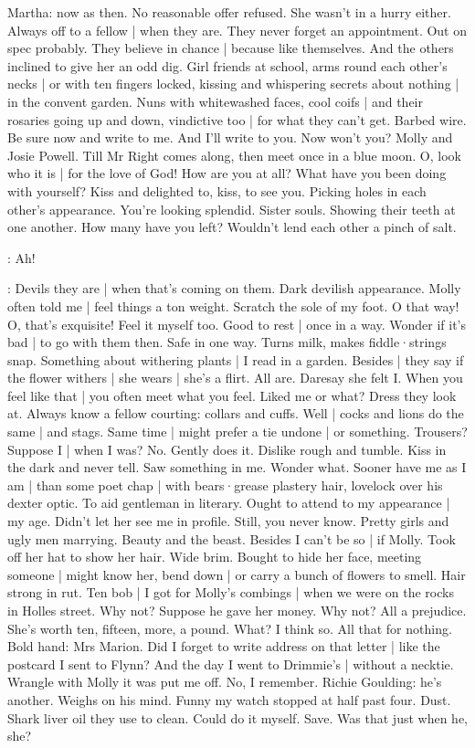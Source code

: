 Martha:
now as then.
No reasonable offer refused.
She wasn't in a hurry either.
Always off to a fellow |
when they are.
They never forget an appointment.
Out on spec probably.
They believe in chance |
because like themselves.
And the others inclined to give her an odd dig.
Girl friends at school,
arms round each other's necks |%
or with ten fingers locked,
kissing and whispering secrets about nothing |
in the convent garden.
Nuns with whitewashed faces,
cool coifs |
and their rosaries
going up and down,
vindictive too |
for what they can't get.
Barbed wire.
Be sure now and write to me.
And I'll write to you.
Now won't you?
Molly and Josie Powell.
Till Mr Right comes along,
then meet once in a blue moon.
O,
look who it is |
for the love of God!
How are you at all?
What have you been doing with yourself?
Kiss and delighted to,
kiss,
to see you.
Picking holes in each other's appearance.
You're looking splendid.
Sister souls.
Showing their teeth at one another.
How many have you left?
Wouldn't lend each other
a pinch of salt.

\Bloom:
Ah!

\Bloom:
Devils they are |
when that's coming on them.
Dark devilish appearance.
Molly often told me |
feel things a ton weight.
Scratch the sole of my foot.
O that way!
O,
that's exquisite!
Feel it myself too.
Good to rest |
once in a way.
Wonder if it's bad |
to go with them then.
Safe in one way.
Turns milk,
makes fiddle·strings snap.
Something about withering plants |
I read in a garden.
Besides |
they say if the flower withers |
she wears |
she's a flirt.
All are.
Daresay she felt I.
When you feel like that |
you often meet what you feel.
Liked me or what?
Dress they look at.
Always know a fellow courting:
collars and cuffs.%
Well |
cocks and lions do the same |
and stags.
Same time |
might prefer a tie undone |
or something.
Trousers?
Suppose I |
when I was?
No.
Gently does it.
Dislike rough and tumble.
Kiss in the dark
and never tell.
Saw something in me.
Wonder what.
Sooner have me
as I am |
than some poet chap |
with bears·grease plastery hair,
lovelock over his dexter optic.
To aid gentleman in literary.
Ought to attend to my appearance |
my age.
Didn't let her see me in profile.
Still,
you never know.
Pretty girls and ugly men marrying.
Beauty and the beast.
Besides I can't be so |
if Molly.
Took off her hat to show her hair.
Wide brim.
Bought to hide her face,
meeting someone |
might know her,
bend down |
or carry a bunch of flowers to smell.
Hair strong in rut.
Ten bob |
I got for Molly's combings |
when we were on the rocks
in Holles street.
Why not?
Suppose he gave her money.
Why not?
All a prejudice.
She's worth ten,
fifteen,
more,
a pound.
What?
I think so.
All that for nothing.
Bold hand:
Mrs Marion.
Did I forget
to write address on that letter |
like the postcard I sent to Flynn?
And the day I went to Drimmie's |
without a necktie.
Wrangle with Molly
it was put me off.
No,
I remember.
Richie Goulding:
he's another.
Weighs on his mind.
Funny my watch stopped at half past four.
Dust.
Shark liver oil
they use to clean.
Could do it myself.
Save.
Was that just when he,
she?

